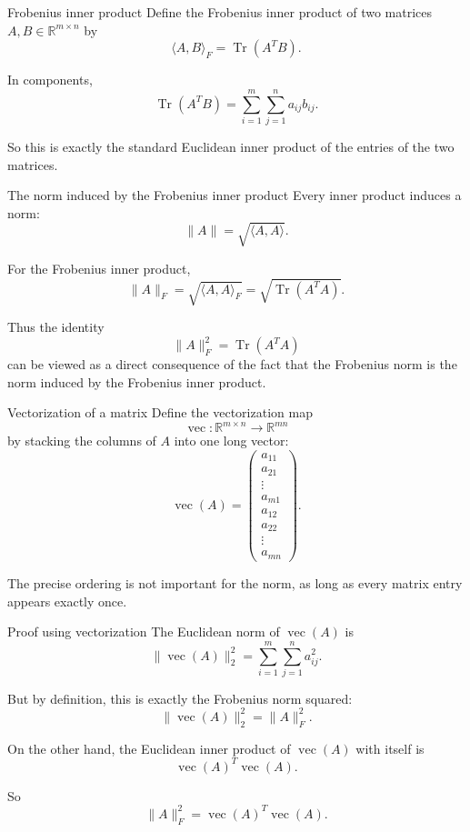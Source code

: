 \documentclass[aspectratio=169]{beamer}
\begin{document}
\begin{frame}{Frobenius inner product}
Define the Frobenius inner product of two matrices \(A,B\in\mathbb{R}^{m\times n}\) by
\[
\langle A,B\rangle_F
=
\operatorname{Tr}(A^T B).
\]

In components,
\[
\operatorname{Tr}(A^T B)
=
\sum_{i=1}^{m}\sum_{j=1}^{n} a_{ij}b_{ij}.
\]

So this is exactly the standard Euclidean inner product of the entries of the two matrices.
\end{frame}

\begin{frame}{The norm induced by the Frobenius inner product}
Every inner product induces a norm:
\[
\|A\|=\sqrt{\langle A,A\rangle}.
\]

For the Frobenius inner product,
\[
\|A\|_F
=
\sqrt{\langle A,A\rangle_F}
=
\sqrt{\operatorname{Tr}(A^T A)}.
\]

Thus the identity
\[
\|A\|_F^2=\operatorname{Tr}(A^T A)
\]
can be viewed as a direct consequence of the fact that the Frobenius norm is the norm induced by the Frobenius inner product.
\end{frame}

\begin{frame}{Vectorization of a matrix}
Define the vectorization map
\[
\operatorname{vec}: \mathbb{R}^{m\times n}\to \mathbb{R}^{mn}
\]
by stacking the columns of \(A\) into one long vector:
\[
\operatorname{vec}(A)
=
\begin{pmatrix}
a_{11}\\
a_{21}\\
\vdots\\
a_{m1}\\
a_{12}\\
a_{22}\\
\vdots\\
a_{mn}
\end{pmatrix}.
\]

The precise ordering is not important for the norm, as long as every matrix entry appears exactly once.
\end{frame}

\begin{frame}{Proof using vectorization}
The Euclidean norm of \(\operatorname{vec}(A)\) is
\[
\|\operatorname{vec}(A)\|_2^2
=
\sum_{i=1}^{m}\sum_{j=1}^{n} a_{ij}^2.
\]

But by definition, this is exactly the Frobenius norm squared:
\[
\|\operatorname{vec}(A)\|_2^2=\|A\|_F^2.
\]

On the other hand, the Euclidean inner product of \(\operatorname{vec}(A)\) with itself is
\[
\operatorname{vec}(A)^T\operatorname{vec}(A).
\]

So
\[
\|A\|_F^2=\operatorname{vec}(A)^T\operatorname{vec}(A).
\]
\end{frame}
\end{document}
